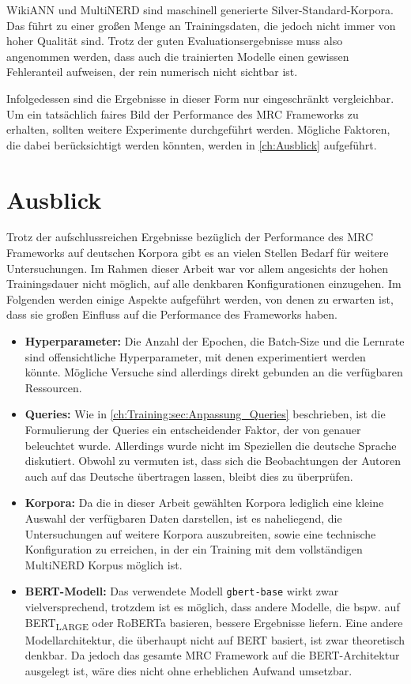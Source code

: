 WikiANN und MultiNERD sind maschinell generierte Silver-Standard-Korpora. Das führt zu einer großen Menge an Trainingsdaten, die jedoch nicht immer von hoher Qualität sind. Trotz der guten Evaluationsergebnisse muss also angenommen werden, dass auch die trainierten Modelle einen gewissen Fehleranteil aufweisen, der rein numerisch nicht sichtbar ist.

Infolgedessen sind die Ergebnisse in dieser Form nur eingeschränkt vergleichbar. Um ein tatsächlich faires Bild der Performance des MRC Frameworks zu erhalten, sollten weitere Experimente durchgeführt werden. Mögliche Faktoren, die dabei berücksichtigt werden könnten, werden in \autoref{ch:Ausblick} aufgeführt.

\chapter{Ausblick}
\label{ch:Ausblick}

Trotz der aufschlussreichen Ergebnisse bezüglich der Performance des MRC Frameworks auf deutschen Korpora gibt es an vielen Stellen Bedarf für weitere Untersuchungen. Im Rahmen dieser Arbeit war vor allem angesichts der hohen Trainingsdauer nicht möglich, auf alle denkbaren Konfigurationen einzugehen. Im Folgenden werden einige Aspekte aufgeführt werden, von denen zu erwarten ist, dass sie großen Einfluss auf die Performance des Frameworks haben.

\begin{itemize}
	\item \textbf{Hyperparameter:} Die Anzahl der Epochen, die Batch-Size und die Lernrate sind offensichtliche Hyperparameter, mit denen experimentiert werden könnte. Mögliche Versuche sind allerdings direkt gebunden an die verfügbaren Ressourcen.
	\item \textbf{Queries:} Wie in \autoref{ch:Training:sec:Anpassung_Queries} beschrieben, ist die Formulierung der Queries ein entscheidender Faktor, der von  genauer beleuchtet wurde. Allerdings wurde nicht im Speziellen die deutsche Sprache diskutiert. Obwohl zu vermuten ist, dass sich die Beobachtungen der Autoren auch auf das Deutsche übertragen lassen, bleibt dies zu überprüfen.
	\item \textbf{Korpora:} Da die in dieser Arbeit gewählten Korpora lediglich eine kleine Auswahl der verfügbaren Daten darstellen, ist es naheliegend, die Untersuchungen auf weitere Korpora auszubreiten, sowie eine technische Konfiguration zu erreichen, in der ein Training mit dem vollständigen MultiNERD Korpus möglich ist.
	\item \textbf{BERT-Modell:} Das verwendete Modell \verb|gbert-base| wirkt zwar vielversprechend, trotzdem ist es möglich, dass andere Modelle, die bspw. auf BERT\textsubscript{LARGE} oder RoBERTa basieren, bessere Ergebnisse liefern. Eine andere Modellarchitektur, die überhaupt nicht auf BERT basiert, ist zwar theoretisch denkbar. Da jedoch das gesamte MRC Framework auf die BERT-Architektur ausgelegt ist, wäre dies nicht ohne erheblichen Aufwand umsetzbar.
\end{itemize}

